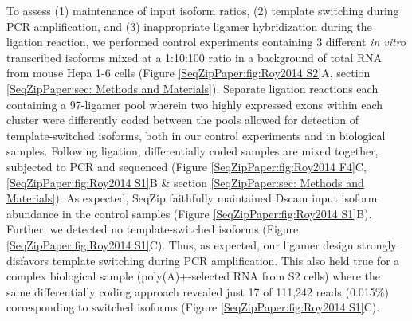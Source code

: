 		To assess (1) maintenance of input isoform ratios, (2) template switching during PCR amplification, and (3) inappropriate ligamer hybridization during the ligation reaction, we performed control experiments containing 3 different \textit{in vitro} transcribed \dscam{} isoforms mixed at a 1:10:100 ratio in a background of total RNA from mouse Hepa 1-6 cells (Figure \ref{SeqZipPaper:fig:Roy2014 S2}A, section \ref{SeqZipPaper:sec: Methods and Materials}). Separate ligation reactions each containing a 97-ligamer pool wherein two highly expressed exons within each cluster were differently coded between the pools allowed for detection of template-switched isoforms, both in our control experiments and in biological samples. Following ligation, differentially coded samples are mixed together, subjected to PCR and sequenced (Figure \ref{SeqZipPaper:fig:Roy2014 F4}C, \ref{SeqZipPaper:fig:Roy2014 S1}B \& section \ref{SeqZipPaper:sec: Methods and Materials}). As expected, SeqZip faithfully maintained Dscam input isoform abundance in the control samples (Figure \ref{SeqZipPaper:fig:Roy2014 S1}B). Further, we detected no template-switched isoforms (Figure \ref{SeqZipPaper:fig:Roy2014 S1}C). Thus, as expected, our ligamer design strongly disfavors template switching during PCR amplification. This also held true for a complex biological sample (poly(A)+-selected RNA from S2 cells) where the same differentially coding approach revealed just 17 of 111,242 reads (0.015\%) corresponding to switched isoforms (Figure \ref{SeqZipPaper:fig:Roy2014 S1}C).

